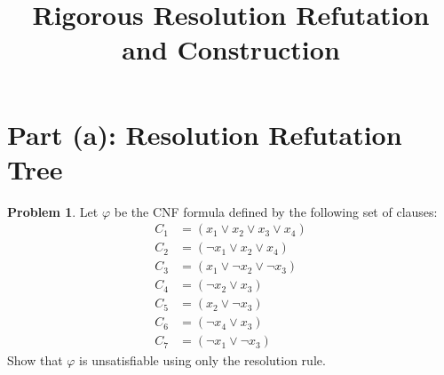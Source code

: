 \documentclass[12pt,a4paper]{article}
\title{\textbf{Rigorous Resolution Refutation and Construction}}
\author{}
\date{}
\theoremstyle{definition}
\newtheorem{problem}{Problem}
\begin{document}
\maketitle

\section*{Part (a): Resolution Refutation Tree}

\begin{problem}
Let $\varphi$ be the CNF formula defined by the following set of clauses:
\begin{align*}
    C_1 &= (x_1 \lor x_2 \lor x_3 \lor x_4) \\
    C_2 &= (\neg x_1 \lor x_2 \lor x_4) \\
    C_3 &= (x_1 \lor \neg x_2 \lor \neg x_3) \\
    C_4 &= (\neg x_2 \lor x_3) \\
    C_5 &= (x_2 \lor \neg x_3) \\
    C_6 &= (\neg x_4 \lor x_3) \\
    C_7 &= (\neg x_1 \lor \neg x_3)
\end{align*}
Show that $\varphi$ is unsatisfiable using only the resolution rule.
\end{problem}
\end{document}
